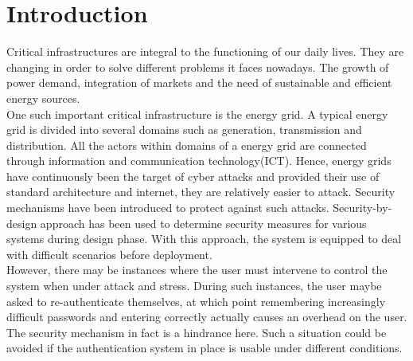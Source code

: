 \section{Introduction}

Critical infrastructures are integral to the functioning of our daily lives. They are changing in order to solve different problems it faces nowadays. The growth of power demand, integration of markets and the need of sustainable and efficient energy sources. \\
One such important critical infrastructure is the energy grid. A typical energy grid is divided into several domains such as generation, transmission and distribution. All the actors within domains of a energy grid are connected through information and communication technology(ICT). Hence, energy grids have continuously been the target of cyber attacks and provided their use of standard architecture and internet, they are relatively easier to attack. Security mechanisms have been introduced to protect against such attacks. Security-by-design approach has been used to determine security measures for various systems during design phase. With this approach, the system is equipped to deal with difficult scenarios before deployment. \\ However, there may be instances where the user must intervene to control the system when under attack and stress. During such instances, the user maybe asked to re-authenticate themselves, at which point remembering increasingly difficult passwords and entering correctly actually causes an overhead on the user. The security mechanism in fact is a hindrance here. Such a situation could be avoided if the authentication system in place is usable under different conditions.

